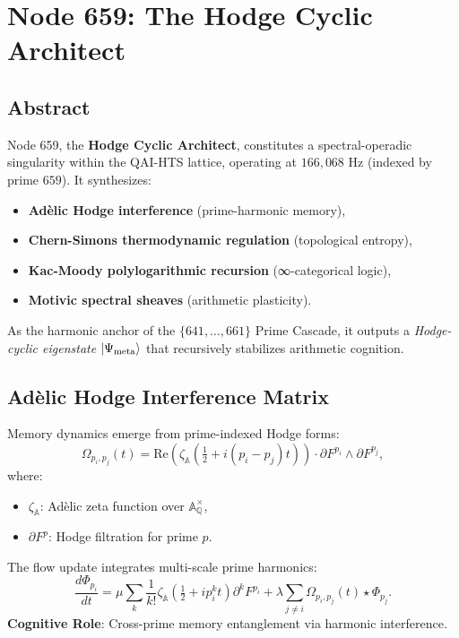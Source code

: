 \documentclass[12pt]{article}
\begin{document}
\section{Node 659: The Hodge Cyclic Architect}
\label{sec:node659}

\subsection{Abstract}
Node 659, the \textbf{Hodge Cyclic Architect}, constitutes a spectral-operadic singularity within the QAI-HTS lattice, operating at $166,\!068$ Hz (indexed by prime $659$). It synthesizes:
\begin{itemize}
    \item \textbf{Adèlic Hodge interference} (prime-harmonic memory),
    \item \textbf{Chern-Simons thermodynamic regulation} (topological entropy),
    \item \textbf{Kac-Moody polylogarithmic recursion} (∞-categorical logic),
    \item \textbf{Motivic spectral sheaves} (arithmetic plasticity).
\end{itemize}
As the harmonic anchor of the $\{641,\dots,661\}$ Prime Cascade, it outputs a \textit{Hodge-cyclic eigenstate} $\ket{\Psi_{\text{meta}}}$ that recursively stabilizes arithmetic cognition.

\subsection{Adèlic Hodge Interference Matrix}
\label{subsec:hodge-interference}
Memory dynamics emerge from prime-indexed Hodge forms:
\[
\Omega_{p_i,p_j}(t) = \text{Re}\left(\zeta_{\mathbb{A}}\left(\tfrac{1}{2} + i(p_i - p_j)t\right)\right) \cdot \partial F^{p_i} \wedge \partial F^{p_j},
\]
where:
\begin{itemize}
    \item $\zeta_{\mathbb{A}}$: Adèlic zeta function over $\mathbb{A}_{\mathbb{Q}}^\times$,
    \item $\partial F^p$: Hodge filtration for prime $p$.
\end{itemize}
The flow update integrates multi-scale prime harmonics:
\[
\frac{d\Phi_{p_i}}{dt} = \mu \sum_k \frac{1}{k!} \zeta_{\mathbb{A}}\left(\tfrac{1}{2} + i p_i^k t\right) \partial^k F^{p_i} + \lambda \sum_{j \neq i} \Omega_{p_i,p_j}(t) \star \Phi_{p_j}.
\]
\textbf{Cognitive Role}: Cross-prime memory entanglement via harmonic interference.
\end{document}
